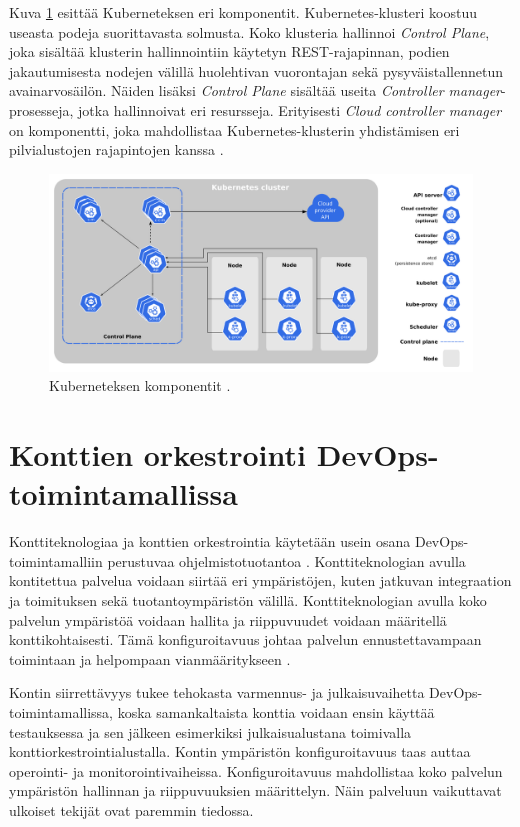 Kuva \ref{fig:kubernetes} esittää Kuberneteksen eri komponentit.
Kubernetes-klusteri koostuu useasta podeja suorittavasta solmusta.
Koko klusteria hallinnoi \textit{Control Plane}, joka sisältää klusterin hallinnointiin käytetyn REST-rajapinnan, podien jakautumisesta nodejen välillä huolehtivan vuorontajan sekä pysyväistallennetun avainarvosäilön.
Näiden lisäksi \textit{Control Plane} sisältää useita \textit{Controller manager}-prosesseja, jotka hallinnoivat eri resursseja.
Erityisesti \textit{Cloud controller manager} on komponentti, joka mahdollistaa Kubernetes-klusterin yhdistämisen eri pilvialustojen rajapintojen kanssa \cite{components23}.

\begin{figure}[ht]
\begin{center}
\includegraphics[width=1\textwidth]{figures/kubernetes_components.png}
\caption{Kuberneteksen komponentit \cite{components23}\label{fig:kubernetes}.}
\end{center}
\end{figure}

\section{Konttien orkestrointi DevOps-toimintamallissa\label{orchestration:devops}}

Konttiteknologiaa ja konttien orkestrointia käytetään usein osana DevOps-toimintamalliin perustuvaa ohjelmistotuotantoa \cite{Kang16, Narasimhulu23}.
Konttiteknologian avulla kontitettua palvelua voidaan siirtää eri ympäristöjen, kuten jatkuvan integraation ja toimituksen sekä tuotantoympäristön välillä.
Konttiteknologian avulla koko palvelun ympäristöä voidaan hallita ja riippuvuudet voidaan määritellä konttikohtaisesti.
Tämä konfiguroitavuus johtaa palvelun ennustettavampaan toimintaan ja helpompaan vianmääritykseen \cite{Narasimhulu23}.

Kontin siirrettävyys tukee tehokasta varmennus- ja julkaisuvaihetta DevOps-toimintamal\-lissa, koska samankaltaista konttia voidaan ensin käyttää testauksessa ja sen jälkeen esimerkiksi julkaisualustana toimivalla konttiorkestrointialustalla.
Kontin ympäristön konfiguroitavuus taas auttaa operointi- ja monitorointivaiheissa.
Konfiguroitavuus mahdollistaa koko palvelun ympäristön hallinnan ja riippuvuuksien määrittelyn.
Näin palveluun vaikuttavat ulkoiset tekijät ovat paremmin tiedossa. %

